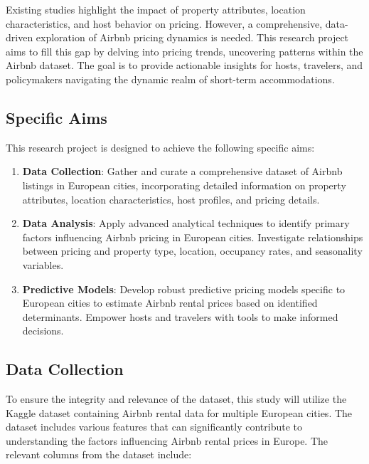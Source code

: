 \documentclass[12pt, letterpaper]{article}
\begin{document}
Existing studies highlight the impact of property attributes, location characteristics, and host behavior on pricing. However, a comprehensive, data-driven exploration of Airbnb pricing dynamics is needed. This research project aims to fill this gap by delving into pricing trends, uncovering patterns within the Airbnb dataset. The goal is to provide actionable insights for hosts, travelers, and policymakers navigating the dynamic realm of short-term accommodations.

\subsection*{Specific Aims}
This research project is designed to achieve the following specific aims:

\begin{enumerate}
  \item \textbf{Data Collection}: Gather and curate a comprehensive dataset of Airbnb listings in European cities, incorporating detailed information on property attributes, location characteristics, host profiles, and pricing details.
  \item \textbf{Data Analysis}: Apply advanced analytical techniques to identify primary factors influencing Airbnb pricing in European cities. Investigate relationships between pricing and property type, location, occupancy rates, and seasonality variables.
  \item \textbf{Predictive Models}: Develop robust predictive pricing models specific to European cities to estimate Airbnb rental prices based on identified determinants. Empower hosts and travelers with tools to make informed decisions.
\end{enumerate}

\subsection*{Data Collection}
To ensure the integrity and relevance of the dataset, this study will utilize the Kaggle dataset containing Airbnb rental data for multiple European cities. The dataset includes various features that can significantly contribute to understanding the factors influencing Airbnb rental prices in Europe. The relevant columns from the dataset include:
\end{document}
